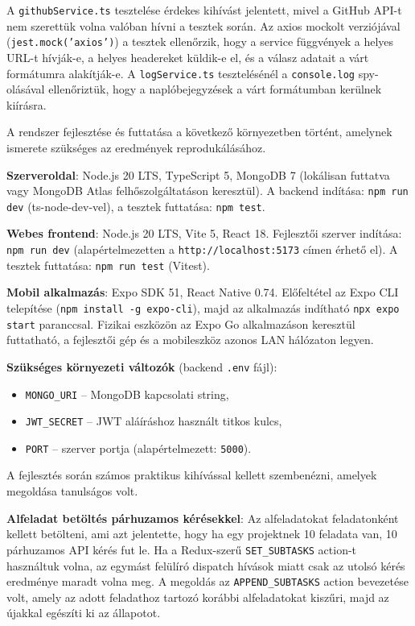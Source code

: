
A \texttt{githubService.ts} tesztelése érdekes kihívást jelentett, mivel a GitHub API-t nem szerettük volna valóban hívni a tesztek során. Az axios mockolt verziójával (\texttt{jest.\allowbreak{}mock(\allowbreak{}'axios')}) a tesztek ellenőrzik, hogy a service függvények a helyes URL-t hívják-e, a helyes headereket küldik-e el, és a válasz adatait a várt formátumra alakítják-e. A \texttt{logService.ts} tesztelésénél a \texttt{console.log} spy-olásával ellenőriztük, hogy a naplóbejegyzések a várt formátumban kerülnek kiírásra.



A rendszer fejlesztése és futtatása a következő környezetben történt, amelynek ismerete szükséges az eredmények reprodukálásához.

\textbf{Szerveroldal}: Node.js 20 LTS, TypeScript 5, MongoDB 7 (lokálisan futtatva vagy MongoDB Atlas felhőszolgáltatáson keresztül). A backend indítása: \texttt{npm run dev} (ts-node-dev-vel), a tesztek futtatása: \texttt{npm test}.

\textbf{Webes frontend}: Node.js 20 LTS, Vite 5, React 18. Fejlesztői szerver indítása: \texttt{npm run dev} (alapértelmezetten a \texttt{http://localhost:5173} címen érhető el). A tesztek futtatása: \texttt{npm run test} (Vitest).

\textbf{Mobil alkalmazás}: Expo SDK 51, React Native 0.74. Előfeltétel az Expo CLI telepítése (\texttt{npm install -g expo-cli}), majd az alkalmazás indítható \texttt{npx expo start} paranccsal. Fizikai eszközön az Expo Go alkalmazáson keresztül futtatható, a fejlesztői gép és a mobileszköz azonos LAN hálózaton legyen.

\textbf{Szükséges környezeti változók} (backend \texttt{.env} fájl):
\begin{itemize}
  \item \texttt{MONGO\_URI} -- MongoDB kapcsolati string,
  \item \texttt{JWT\_SECRET} -- JWT aláíráshoz használt titkos kulcs,
  \item \texttt{PORT} -- szerver portja (alapértelmezett: \texttt{5000}).
\end{itemize}


A fejlesztés során számos praktikus kihívással kellett szembenézni, amelyek megoldása tanulságos volt.

\textbf{Alfeladat betöltés párhuzamos kérésekkel}: Az alfeladatokat feladatonként kellett betölteni, ami azt jelentette, hogy ha egy projektnek 10 feladata van, 10 párhuzamos API kérés fut le. Ha a Redux-szerű \texttt{SET\_SUBTASKS} action-t használtuk volna, az egymást felülíró dispatch hívások miatt csak az utolsó kérés eredménye maradt volna meg. A megoldás az \texttt{APPEND\_SUBTASKS} action bevezetése volt, amely az adott feladathoz tartozó korábbi alfeladatokat kiszűri, majd az újakkal egészíti ki az állapotot.

